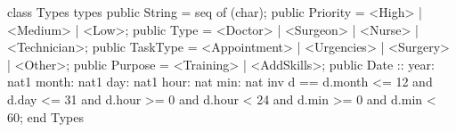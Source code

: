 \begin{vdmpp}[breaklines=true]
class Types
types
 public String = seq of (char);
 public Priority = <High> | <Medium> | <Low>;
 public Type = <Doctor> | <Surgeon> | <Nurse> | <Technician>;
 public TaskType = <Appointment> | <Urgencies> | <Surgery> | <Other>;
 public Purpose = <Training> | <AddSkills>;
 public Date ::  year: nat1
         month: nat1
         day: nat1
         hour: nat
         min: nat
 inv d == d.month <= 12 and d.day <= 31 and d.hour >= 0 and d.hour < 24 and d.min >= 0 and d.min < 60;
end Types
\end{vdmpp}
